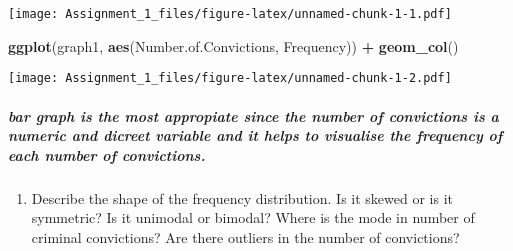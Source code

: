 \documentclass[]{article}
\newenvironment{Shaded}{\begin{snugshade}}{\end{snugshade}}
\newcommand{\KeywordTok}[1]{\textcolor[rgb]{0.13,0.29,0.53}{\textbf{#1}}}
\newcommand{\DataTypeTok}[1]{\textcolor[rgb]{0.13,0.29,0.53}{#1}}
\newcommand{\DecValTok}[1]{\textcolor[rgb]{0.00,0.00,0.81}{#1}}
\newcommand{\StringTok}[1]{\textcolor[rgb]{0.31,0.60,0.02}{#1}}
\newcommand{\OtherTok}[1]{\textcolor[rgb]{0.56,0.35,0.01}{#1}}
\newcommand{\OperatorTok}[1]{\textcolor[rgb]{0.81,0.36,0.00}{\textbf{#1}}}
\newcommand{\NormalTok}[1]{#1}
\providecommand{\tightlist}{%
  \setlength{\itemsep}{0pt}\setlength{\parskip}{0pt}}
\let\oldsubparagraph\subparagraph
\renewcommand{\subparagraph}[1]{\oldsubparagraph{#1}\mbox{}}
\begin{document}
\begin{Shaded}
\end{Shaded}

\texttt{[image: Assignment\_1\_files/figure-latex/unnamed-chunk-1-1.pdf]}

\begin{Shaded}
\begin{Highlighting}[]
\KeywordTok{ggplot}\NormalTok{(graph1, }\KeywordTok{aes}\NormalTok{(Number.of.Convictions, Frequency)) }\OperatorTok{+}
\StringTok{  }\KeywordTok{geom_col}\NormalTok{()}
\end{Highlighting}
\end{Shaded}

\texttt{[image: Assignment\_1\_files/figure-latex/unnamed-chunk-1-2.pdf]}

\subparagraph{bar graph is the most appropiate since the number of
convictions is a numeric and dicreet variable and it helps to visualise
the frequency of each number of
convictions.}\label{bar-graph-is-the-most-appropiate-since-the-number-of-convictions-is-a-numeric-and-dicreet-variable-and-it-helps-to-visualise-the-frequency-of-each-number-of-convictions.}

\begin{enumerate}
\def\labelenumi{\alph{enumi}.}
\setcounter{enumi}{5}
\tightlist
\item
  Describe the shape of the frequency distribution. Is it skewed or is
  it symmetric? Is it unimodal or bimodal? Where is the mode in number
  of criminal convictions? Are there outliers in the number of
  convictions?
\end{enumerate}
\end{document}

